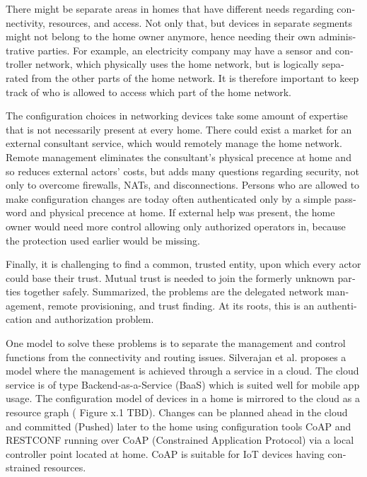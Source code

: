 \documentclass[12pt,a4paper,english]{tutthesis}
\begin{document}
\begin{otherlanguage}{english}
There might be separate areas in homes that have different needs regarding
connectivity, resources, and access. Not only that, but devices in
separate segments might not belong to the home owner anymore, hence needing
their own administrative parties. For example, an electricity company may
have a sensor and controller network, which physically uses the home network, but
is logically separated from the other parts of the home network. It is therefore
important to keep track of who is allowed to access which part of the
home network. 


The configuration choices in networking devices take some
amount of expertise that is not necessarily present at every
home. There could exist a market for an external consultant service, which would
remotely manage the home network.
Remote management eliminates the consultant's 
physical precence at home and so reduces external actors' costs, but adds many questions
regarding security, not only to overcome firewalls, NATs, and disconnections.
Persons who are allowed to make configuration changes are today
often authenticated only by a simple password and physical precence at home.
If external help was present, the home owner would need more 
control allowing only authorized operators in, because the 
protection used earlier would be missing.

Finally, it is challenging to find a common, 
trusted entity, upon which every actor could base their trust.
Mutual trust
 is needed to join the formerly unknown parties together
safely. 
Summarized, the problems are the delegated network management, remote
provisioning, and trust finding. At its roots, this is an authentication
and authorization problem.








One model to solve these problems is to separate the management and
control functions from the connectivity and routing
issues. Silverajan et al.\cite{silverajan2015collaborative} proposes
a model where the management is achieved through a service in a cloud.
The cloud service is of type Backend-as-a-Service (BaaS) which is suited
well for mobile app usage. The
configuration model of devices in a home is mirrored to the cloud as a
resource graph ( Figure x.1 TBD). Changes can be planned ahead in the cloud
and committed (Pushed) later to the home  using configuration 
tools CoAP and RESTCONF running over CoAP (Constrained Application
Protocol)
via a local controller point located at home.
CoAP is suitable for IoT devices having constrained resources.


\end{otherlanguage}
\end{document}

